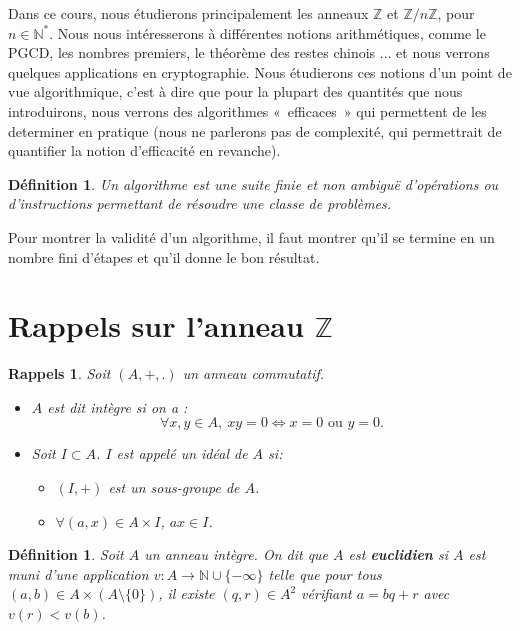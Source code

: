 \documentclass[12pt]{report}
\newtheorem*{rap}{Rappels}
\newtheorem{Def}[thm]{Définition}
\newcommand{\N}{\mathbb{N}}
\newcommand{\Z}{\mathbb{Z}}
\begin{document}
 Dans ce cours, nous étudierons principalement les anneaux $\Z$ et  $\Z/n\Z$, pour $n\in \N^*$. Nous nous intéresserons à différentes notions arithmétiques, comme le PGCD, les nombres premiers, le théorème des restes chinois ... et nous verrons quelques applications en cryptographie. Nous étudierons ces notions d'un point de vue algorithmique, c'est à dire que pour la plupart des quantités que nous introduirons,  nous verrons des algorithmes «~efficaces~» qui permettent de les determiner en pratique (nous ne parlerons pas de complexité, qui permettrait de quantifier la notion d'efficacité en revanche).  
 
 \begin{Def}
 Un algorithme est une suite finie et non ambiguë d’opérations ou d'instructions permettant de résoudre une classe de problèmes. 
 \end{Def}
 
 Pour montrer la validité d'un algorithme, il faut montrer qu'il se termine en un nombre fini d'étapes et qu'il donne le bon résultat.


\section{Rappels sur l'anneau $\mathbb{Z}$}

\begin{rap}
Soit $(A,+,.)$ un anneau commutatif. 
\begin{itemize}
\item[•] $A$ est dit intègre si on a : \[\forall x,y\in A,\ xy=0 \Leftrightarrow x=0\text{ ou }y=0.\]
\item[•] Soit $I \subset A$. $I$ est appelé un idéal de $A$ si:
\begin{itemize}
\item[$*$]$(I,+)$ est un sous-groupe de $A$.
\item[$*$] $\forall (a,x) \in A \times I$, $ax \in I$.
\end{itemize} 
\end{itemize}
\end{rap}

\begin{Def}
Soit $A$ un anneau intègre. On dit que $A$ est \textbf{euclidien} si $A$ est muni d'une application $v: A \rightarrow \mathbb{N}\cup \{ -\infty \}$ telle que pour tous $(a,b)\in A\times (A\setminus \{ 0 \})$, il existe $(q,r)\in A^2$ vérifiant $a=bq+r$ avec $v(r)<v(b)$.
\end{Def}
\end{document}

